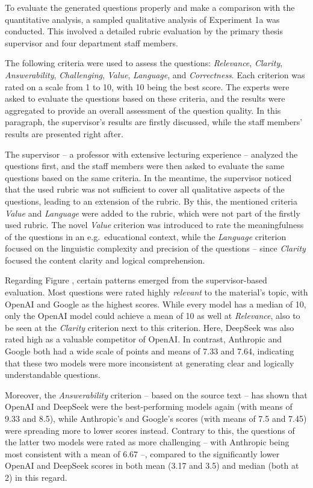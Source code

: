 To evaluate the generated questions properly and make a comparison with the quantitative analysis, a sampled qualitative analysis of Experiment 1a was conducted. This involved a detailed rubric evaluation by the primary thesis supervisor and four department staff members.

 The following criteria were used to assess the questions: \textit{Relevance}, \textit{Clarity}, \textit{Answerability}, \textit{Challenging}, \textit{Value}, \textit{Language}, and \textit{Correctness}. Each criterion was rated on a scale from 1 to 10, with 10 being the best score. The experts were asked to evaluate the questions based on these criteria, and the results were aggregated to provide an overall assessment of the question quality. In this paragraph, the supervisor's results are firstly discussed, while the staff members' results are presented right after. 

The supervisor -- a professor with extensive lecturing experience -- analyzed the questions first, and the staff members were then asked to evaluate the same questions based on the same criteria. In the meantime, the supervisor noticed that the used rubric was not sufficient to cover all qualitative aspects of the questions, leading to an extension of the rubric. By this, the mentioned criteria \textit{Value} and \textit{Language} were added to the rubric, which were not part of the firstly used rubric. The novel \textit{Value} criterion was introduced to rate the meaningfulness of the questions in an e.g.\ educational context, while the \textit{Language} criterion focused on the linguistic complexity and precision of the questions -- since \textit{Clarity} focused the content clarity and logical comprehension.

Regarding Figure , certain patterns emerged from the supervisor-based evaluation. Most questions were rated highly \textit{relevant} to the material's topic, with OpenAI and Google as the highest scores. While every model has a median of 10, only the OpenAI model could achieve a mean of 10 as well at \textit{Relevance}, also to be seen at the \textit{Clarity} criterion next to this criterion. Here, DeepSeek was also rated high as a valuable competitor of OpenAI. In contrast, Anthropic and Google both had a wide scale of points and means of 7.33 and 7.64, indicating that these two models were more inconsistent at generating clear and logically understandable questions. 

Moreover, the \textit{Answerability} criterion -- based on the source text -- has shown that OpenAI and DeepSeek were the best-performing models again (with means of 9.33 and 8.5), while Anthropic's and Google's scores (with means of 7.5 and 7.45) were spreading more to lower scores instead. Contrary to this, the questions of the latter two models were rated as more challenging -- with Anthropic being most consistent with a mean of 6.67 --, compared to the significantly lower OpenAI and DeepSeek scores in both mean (3.17 and 3.5) and median (both at 2) in this regard.

